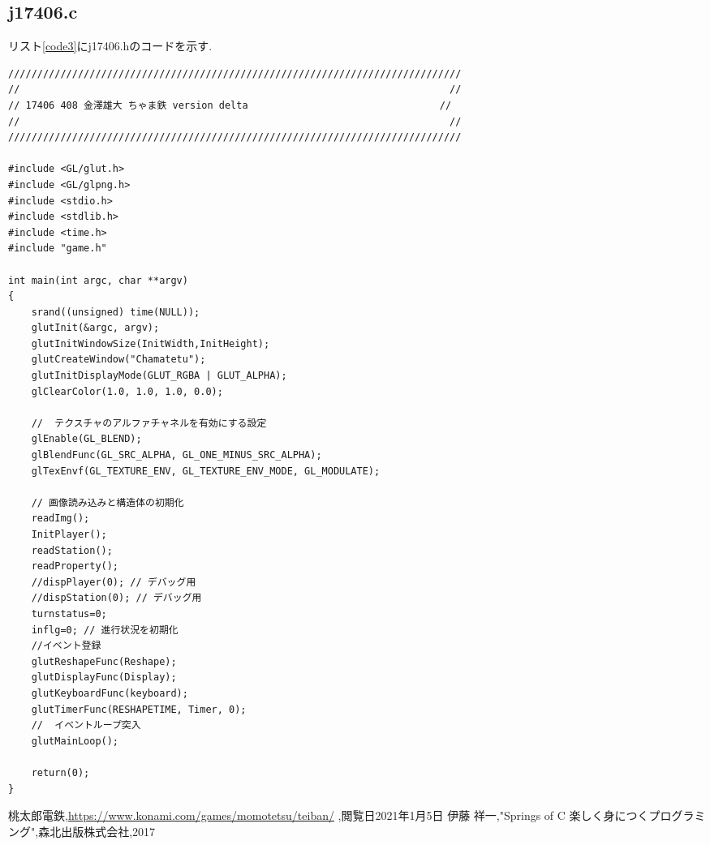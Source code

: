 \documentclass[a4j]{jarticle}
\begin{document}
    \subsection{j17406.c}
    リスト\ref{code3}にj17406.hのコードを示す.
    \begin{lstlisting}[basicstyle=\ttfamily\footnotesize, frame=single,label=code3,caption=j17406.c]
//////////////////////////////////////////////////////////////////////////////
//                                                                          //
// 17406 408 金澤雄大 ちゃま鉄 version delta                                 //
//                                                                          //
//////////////////////////////////////////////////////////////////////////////

#include <GL/glut.h>
#include <GL/glpng.h>
#include <stdio.h>
#include <stdlib.h>
#include <time.h>
#include "game.h"

int main(int argc, char **argv)
{
    srand((unsigned) time(NULL));
    glutInit(&argc, argv);
    glutInitWindowSize(InitWidth,InitHeight);
    glutCreateWindow("Chamatetu");
    glutInitDisplayMode(GLUT_RGBA | GLUT_ALPHA);
    glClearColor(1.0, 1.0, 1.0, 0.0);

    //  テクスチャのアルファチャネルを有効にする設定
    glEnable(GL_BLEND);
    glBlendFunc(GL_SRC_ALPHA, GL_ONE_MINUS_SRC_ALPHA);
    glTexEnvf(GL_TEXTURE_ENV, GL_TEXTURE_ENV_MODE, GL_MODULATE);
    
    // 画像読み込みと構造体の初期化
    readImg();
    InitPlayer();
    readStation();
    readProperty();
    //dispPlayer(0); // デバッグ用
    //dispStation(0); // デバッグ用
    turnstatus=0;
    inflg=0; // 進行状況を初期化
    //イベント登録
    glutReshapeFunc(Reshape);
    glutDisplayFunc(Display);
    glutKeyboardFunc(keyboard);
    glutTimerFunc(RESHAPETIME, Timer, 0);
    //  イベントループ突入
    glutMainLoop();

    return(0);
}
    \end{lstlisting}

    \begin{thebibliography}{9}
          桃太郎電鉄,\url{https://www.konami.com/games/momotetsu/teiban/} ,閲覧日2021年1月5日
         伊藤 祥一,"Springs of C 楽しく身につくプログラミング",森北出版株式会社,2017
        \end{thebibliography}
\end{document}
